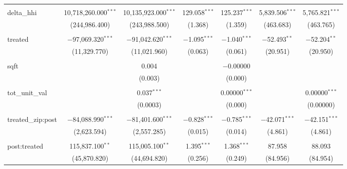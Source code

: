\begin{table}[H]
{\begin{tabular}{@{\extracolsep{5pt}}lcccccc}
   & & & & & & \\  

  delta\_hhi & 10,718,260.000$^{***}$ & 10,135,923.000$^{***}$ & 129.058$^{***}$ & 125.237$^{***}$ & 5,839.506$^{***}$ & 5,765.821$^{***}$ \\  

   & (244,986.400) & (243,988.500) & (1.368) & (1.359) & (463.683) & (463.765) \\  

   & & & & & & \\  

  treated & $-$97,069.320$^{***}$ & $-$91,042.620$^{***}$ & $-$1.095$^{***}$ & $-$1.040$^{***}$ & $-$52.493$^{**}$ & $-$52.204$^{**}$ \\  

   & (11,329.770) & (11,021.960) & (0.063) & (0.061) & (20.951) & (20.950) \\  

   & & & & & & \\  

  sqft &  & 0.004 &  & $-$0.00000 &  &  \\  

   &  & (0.003) &  & (0.000) &  &  \\  

   & & & & & & \\  

  tot\_unit\_val &  & 0.037$^{***}$ &  & 0.00000$^{***}$ &  & 0.00000$^{***}$ \\  

   &  & (0.0003) &  & (0.000) &  & (0.00000) \\  

   & & & & & & \\  

  treated\_zip:post & $-$84,088.990$^{***}$ & $-$81,401.600$^{***}$ & $-$0.828$^{***}$ & $-$0.785$^{***}$ & $-$42.071$^{***}$ & $-$42.151$^{***}$ \\  

   & (2,623.594) & (2,557.285) & (0.015) & (0.014) & (4.861) & (4.861) \\  

   & & & & & & \\  

  post:treated & 115,837.100$^{**}$ & 115,005.100$^{**}$ & 1.395$^{***}$ & 1.368$^{***}$ & 87.958 & 88.093 \\  

   & (45,870.820) & (44,694.820) & (0.256) & (0.249) & (84.956) & (84.954) \\  


\end{tabular}}
\end{table}
